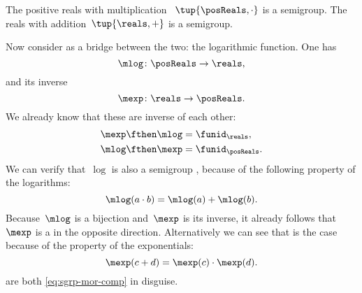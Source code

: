 \begin{example}
	The positive reals with multiplication ~$\tup{\posReals, \cdot}$ is a semigroup.
	The reals with addition~$\tup{\reals, +}$ is a semigroup.

	Now consider as a bridge between the two: the logarithmic function.
	One has
	\begin{equation*}
		\label{eq:log}
		\mlog \colon  \posReals \to \reals,
	\end{equation*}
	and its inverse
	\begin{equation*}
		\label{eq:exp}
		\mexp \colon  \reals \to \posReals.
	\end{equation*}
	We already know that these are inverse of each other:
	\begin{equation*}
		\label{eq:exp-log-are-inverses}
		\begin{aligned}
			\mexp \fthen \mlog & = \funid_{\reals},    \\
			\mlog \fthen \mexp & = \funid_{\posReals}.
		\end{aligned}
	\end{equation*}
	We can verify that~$\log$ is also a semigroup \whomo, because of the following property of the logarithms:
	\begin{equation}
		\label{eq:log-property}
		\mlog(a \cdot b) = \mlog(a) + \mlog(b).
	\end{equation}
	Because~$\mlog$ is a bijection and~$\mexp$ is its inverse, it already follows that~$\mexp$ is a \whomo in the opposite direction.
	Alternatively we can see that is the case because of the property of the exponentials:
	\begin{equation}
		\label{eq:exp-property}
		\mexp(c + d) = \mexp(c) \cdot \mexp(d).
	\end{equation}
	 are both \cref{eq:sgrp-mor-comp} in disguise.
\end{example}

